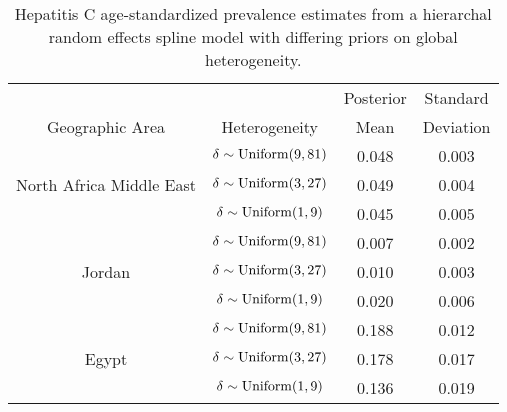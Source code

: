    \begin{table}[h]
        \begin{center}
        \begin{tabular}{|c|c|c|c|}
            \hline
                & & Posterior & Standard \\
                Geographic Area & Heterogeneity & Mean & Deviation \\
            \hline
                & $\delta \sim \operatorname{Uniform}(9,81)$ & 0.048 & 0.003 \\
                North Africa Middle East & $\delta \sim \operatorname{Uniform}(3,27)$ & 0.049 & 0.004 \\
                & $\delta \sim \operatorname{Uniform}(1,9)$ & 0.045 & 0.005 \\
            \hline
                & $\delta \sim \operatorname{Uniform}(9,81)$ & 0.007 & 0.002 \\
                Jordan & $\delta \sim \operatorname{Uniform}(3,27)$ & 0.010 & 0.003 \\
                & $\delta \sim \operatorname{Uniform}(1,9)$ & 0.020 & 0.006 \\
            \hline
                & $\delta \sim \operatorname{Uniform}(9,81)$ & 0.188 & 0.012 \\
                Egypt & $\delta \sim \operatorname{Uniform}(3,27)$ & 0.178 & 0.017 \\
                & $\delta \sim \operatorname{Uniform}(1,9)$ & 0.136 & 0.019 \\
            \hline
        \end{tabular}
        \end{center}
        \caption{ Hepatitis C age-standardized prevalence estimates
          from a hierarchal random effects spline model with differing
          priors on global heterogeneity.}
        \label{tab:app-hepc global rfx}
    \end{table}
